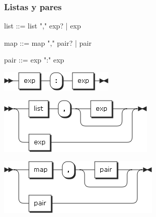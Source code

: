 \subsubsection {Listas y pares}
\begin{multicols}{2}
\begin{myverbatim}      
list ::= list "," exp?
      |  exp
\end{myverbatim}  
\begin{myverbatim}      
map ::=  map "," pair?
      |  pair
   
pair ::= exp ":" exp
\end{myverbatim}  
\begin{center}
\includegraphics[scale=0.5]{diagram/pair.png} \\
\end{center}
\columnbreak	
\begin{center}
\includegraphics[scale=0.5]{diagram/list.png} \\
\end{center}
\begin{center}
\includegraphics[scale=0.5]{diagram/map.png} \\
\end{center}
\end{multicols}

\pagebreak
